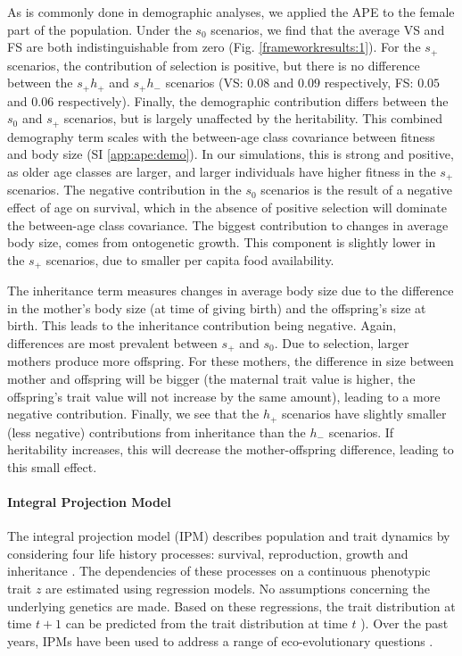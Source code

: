 As is commonly done in demographic analyses, we applied the APE to the female part of the population. Under the $s_0$ scenarios, we find that the average VS and FS are both indistinguishable from zero (Fig. \ref{frameworkresults:1}). For the $s_+$ scenarios, the contribution of selection is positive, but there is no difference between the $s_+ h_+$ and $s_+h_-$ scenarios (VS: $0.08$ and $0.09$ respectively, FS: $0.05$ and $0.06$ respectively). Finally, the demographic contribution differs between the $s_0$ and $s_+$ scenarios, but is largely unaffected by the heritability. This combined demography term scales with the between-age class covariance between fitness and body size (SI \ref{app:ape:demo}). In our simulations, this is strong and positive, as older age classes are larger, and larger individuals have higher fitness in the $s_+$ scenarios. The negative contribution in the $s_0$ scenarios is the result of a negative effect of age on survival, which in the absence of positive selection will dominate the between-age class covariance.
The biggest contribution to changes in average body size, comes from ontogenetic growth. This component is slightly lower in the $s_+$ scenarios, due to smaller per capita food availability.

The inheritance term measures changes in average body size due to the difference in the mother's body size (at time of giving birth) and the offspring's size at birth. This leads to the inheritance contribution being negative. Again, differences are most prevalent between $s_+$ and $s_0$. Due to selection, larger mothers produce more offspring. For these mothers, the difference in size between mother and offspring will be bigger (the maternal trait value is higher, the offspring's trait value will not increase by the same amount), leading to a more negative contribution. Finally, we see that the $h_+$ scenarios have slightly smaller (less negative) contributions from inheritance than the $h_-$ scenarios. If heritability increases, this will decrease the mother-offspring difference, leading to this small effect.

\paragraph{Integral Projection Model}

The integral projection model (IPM) describes population and trait dynamics by considering four life history processes: survival, reproduction, growth and inheritance \parencite{Ellner2006}. The dependencies of these processes on a continuous phenotypic trait $z$ are estimated using regression models. No assumptions concerning the underlying genetics are made. Based on these regressions, the trait distribution at time $t+1$ can be predicted from the trait distribution at time $t$ \parencite[as well as demographic properties, such as population growth rates, e.g.][]{Adler2010,merow2014}).  Over the past years, IPMs have been used to address a range of eco-evolutionary questions \parencite[e.g.][]{metcalf2008evolution,Smallegange2013,traill2014demography}. 

